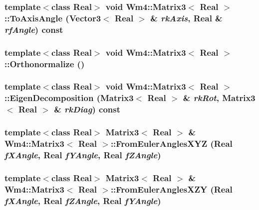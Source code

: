 \subsubsection{\setlength{\rightskip}{0pt plus 5cm}template$<$class Real$>$ void {\bf Wm4::Matrix3}$<$ Real $>$::To\-Axis\-Angle ({\bf Vector3}$<$ Real $>$ \& {\em rk\-Axis}, Real \& {\em rf\-Angle}) const}\label{classWm4_1_1Matrix3_6ea6beaa2d1ef32d5ea1b1275ee61573}


\subsubsection{\setlength{\rightskip}{0pt plus 5cm}template$<$class Real$>$ void {\bf Wm4::Matrix3}$<$ Real $>$::Orthonormalize ()}\label{classWm4_1_1Matrix3_a92c09c69535be8f7c1d6e2589554aef}


\subsubsection{\setlength{\rightskip}{0pt plus 5cm}template$<$class Real$>$ void {\bf Wm4::Matrix3}$<$ Real $>$::Eigen\-Decomposition ({\bf Matrix3}$<$ Real $>$ \& {\em rk\-Rot}, {\bf Matrix3}$<$ Real $>$ \& {\em rk\-Diag}) const}\label{classWm4_1_1Matrix3_5be1cde61f78d9757fec13cb42ed4694}


\subsubsection{\setlength{\rightskip}{0pt plus 5cm}template$<$class Real$>$ {\bf Matrix3}$<$ Real $>$ \& {\bf Wm4::Matrix3}$<$ Real $>$::From\-Euler\-Angles\-XYZ (Real {\em f\-XAngle}, Real {\em f\-YAngle}, Real {\em f\-ZAngle})}\label{classWm4_1_1Matrix3_cd2933f7baa99c5051b8117ed560305a}


\subsubsection{\setlength{\rightskip}{0pt plus 5cm}template$<$class Real$>$ {\bf Matrix3}$<$ Real $>$ \& {\bf Wm4::Matrix3}$<$ Real $>$::From\-Euler\-Angles\-XZY (Real {\em f\-XAngle}, Real {\em f\-ZAngle}, Real {\em f\-YAngle})}\label{classWm4_1_1Matrix3_591aa70b7e90ee54adb61d2afed262c9}



